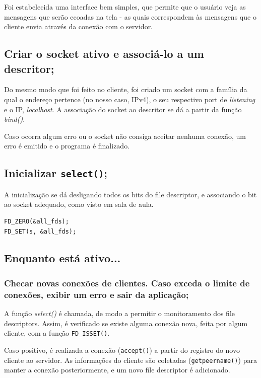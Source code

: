 \documentclass[10pt,twocolumn,letterpaper]{article}
\begin{document}
    Foi estabelecida uma interface bem simples, que permite que o usuário veja as mensagens que serão ecoadas na tela - as quais correspondem às mensagens que o cliente envia através da conexão com o servidor.

\subsection{Criar o socket ativo e associá-lo a um descritor;}

Do mesmo modo que foi feito no cliente, foi criado um socket com a família da qual o endereço pertence (no nosso caso, IPv4), o seu respectivo port de \textit{listening} e o IP, \textit{localhost}. A associação do socket ao descritor se dá a partir da função \textit{bind()}.

Caso ocorra algum erro ou o socket não consiga aceitar nenhuma conexão, um erro é emitido e o programa é finalizado.

\subsection{Inicializar \texttt{select()};}

A inicialização se dá desligando todos os bits do file descriptor, e associando o bit ao socket adequado, como visto em sala de aula.

\begin{lstlisting}[caption={Inicialização de conjunto de descritores}]
FD_ZERO(&all_fds);
FD_SET(s, &all_fds);
\end{lstlisting}

\subsection{Enquanto está ativo...}
\subsubsection{Checar novas conexões de clientes. Caso exceda o limite de conexões, exibir um erro e sair da aplicação;}
A função \textit{select()} é chamada, de modo a permitir o monitoramento dos file descriptors. Assim, é verificado se existe alguma conexão nova, feita por algum cliente, com a função \texttt{FD\_ISSET()}.

Caso positivo, é realizada a conexão (\texttt{accept()}) a partir do registro do novo cliente ao servidor. As informações do cliente são coletadas (\texttt{getpeername()}) para manter a conexão posteriormente, e um novo file descriptor é adicionado.
\end{document}
